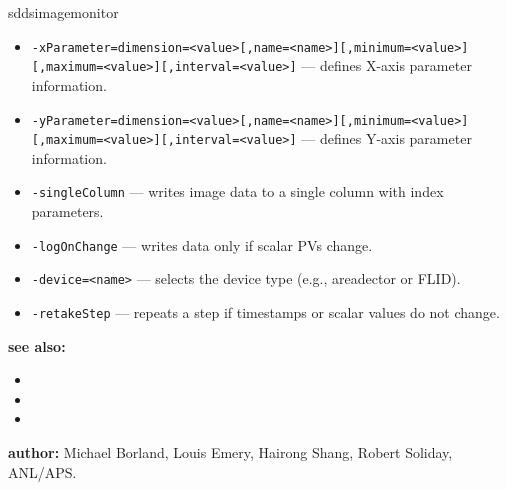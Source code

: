 \begin{sddsprog}{sddsimagemonitor}
\begin{itemize}
  \item {\verb+-xParameter=dimension=<value>[,name=<name>][,minimum=<value>][,maximum=<value>][,interval=<value>]+} ---
        defines X-axis parameter information.
  \item {\verb+-yParameter=dimension=<value>[,name=<name>][,minimum=<value>][,maximum=<value>][,interval=<value>]+} ---
        defines Y-axis parameter information.
  \item {\tt -singleColumn} --- writes image data to a single column with index parameters.
  \item {\tt -logOnChange} --- writes data only if scalar PVs change.
  \item {\verb+-device=<name>+} --- selects the device type (e.g., areadector or FLID).
  \item {\tt -retakeStep} --- repeats a step if timestamps or scalar values do not change.
\end{itemize}
\item \textbf{see also:}
\begin{itemize}
  \item {}
  \item {}
  \item {}
\end{itemize}
\item \textbf{author:} Michael Borland, Louis Emery, Hairong Shang, Robert Soliday, ANL/APS.
\end{sddsprog}
